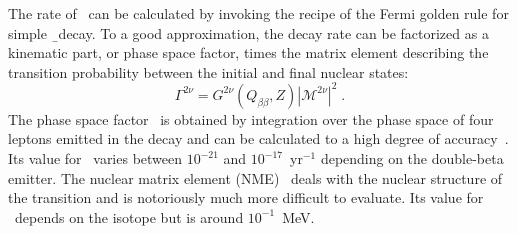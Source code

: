 The rate of \nnbb\ can be calculated by invoking the recipe of the Fermi golden
rule for simple \b\ decay. To a good approximation, the decay rate can be
factorized as a kinematic part, or phase space factor, times the matrix element
describing the transition probability between the initial and final nuclear
states:
\[
  \Gamma^{2\nu} = G^{2\nu}(Q_{\beta\beta},Z) |\mathcal{M}^{2\nu}|^2 \;.
\]
The phase space factor \psft\ is obtained by integration over the phase space
of four leptons emitted in the decay and can be calculated to a high degree of
accuracy~\cite{Kotila2012, Stoica2013}. Its value for \nnbb\ varies between
$10^{-21}$ and $10^{-17}$~yr$^{-1}$ depending on the double-beta emitter.
The nuclear matrix element (NME) \nmet\ deals with the nuclear structure of the
transition and is notoriously much more difficult to evaluate. Its value for
\nnbb\ depends on the isotope but is around $10^{-1}$~MeV.

